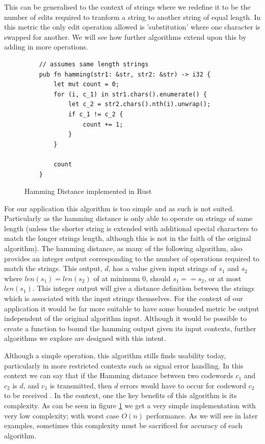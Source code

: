 \documentclass[a4paper,11pt]{article}
\begin{document}
This can be generalised to the context of strings where we redefine it to be the number of edits required to tranform a string to another string of equal length. In this metric the only edit operation allowed is 'substitution' where one character is swapped for another. We will see how further algorithms extend upon this by adding in more operations.

\begin{figure}[H]
    \centering
    \begin{verbatim}
    // assumes same length strings
    pub fn hamming(str1: &str, str2: &str) -> i32 {
        let mut count = 0;
        for (i, c_1) in str1.chars().enumerate() {
            let c_2 = str2.chars().nth(i).unwrap();
            if c_1 != c_2 {
                count += 1;
            }
        }
        
        count
    }
    \end{verbatim}
    \caption{Hamming Distance implemented in Rust}
    \label{fig:hammingImplemented}
\end{figure}

For our application this algorithm is too simple and as such is not suited. Particularly as the hamming distance is only able to operate on strings of same length (unless the shorter string is extended with additional special characters to match the longer strings length, although this is not in the faith of the original algorithm). The hamming distance, as many of the following algorithm, also provides an integer output corresponding to the number of operations required to match the strings. This output, $d$, has a value given input strings of $s_1$ and $s_2$ where $len(s_1) = len(s_2)$ of at minimum 0, should $s_1 == s_2$, or at most $len(s_1)$. This integer output will give a distance definition between the strings which is associated with the input strings themselves. For the context of our application it would be far more suitable to have some bounded metric be output independent of the original algorithm input. Although it would be possible to create a function to bound the hamming output given its input contexts, further algorithms we explore are designed with this intent.

Although a simple operation, this algorithm stills finds usability today, particularly in more restricted contexts such as signal error handling. In this context we can say that if the Hamming distance between two codewords $c_1$ and $c_2$ is $d$, and $c_1$ is transmitted, then $d$ errors would have to occur for codeword $c_2$ to be received \citep{hammingDefinition}. In the context, one the key benefits of this algorithm is its complexity. As can be seen in figure \ref{fig:hammingImplemented} we get a very simple implementation with very low complexity; with worst case ${O}(n)$ performance. As we will see in later examples, sometimes this complexity must be sacrificed for accuracy of each algorithm.
\end{document}
